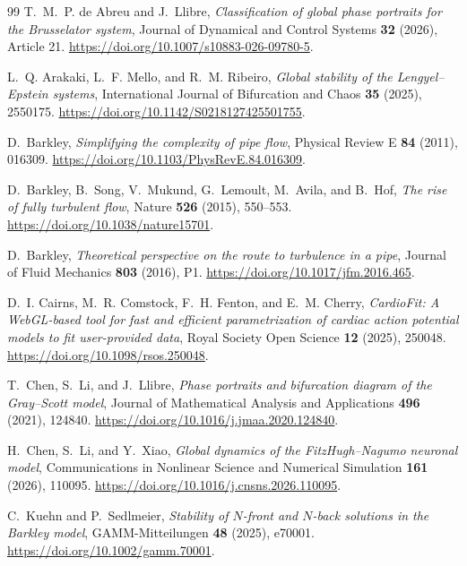 \documentclass[11pt,a4paper]{article}
\begin{document}
\begin{thebibliography}{99}
T.~M.~P. de Abreu and J.~Llibre,
\emph{Classification of global phase portraits for the Brusselator system},
Journal of Dynamical and Control Systems \textbf{32} (2026), Article 21.
\url{https://doi.org/10.1007/s10883-026-09780-5}.

L.~Q. Arakaki, L.~F. Mello, and R.~M. Ribeiro,
\emph{Global stability of the Lengyel--Epstein systems},
International Journal of Bifurcation and Chaos \textbf{35} (2025), 2550175.
\url{https://doi.org/10.1142/S0218127425501755}.

D.~Barkley,
\emph{Simplifying the complexity of pipe flow},
Physical Review E \textbf{84} (2011), 016309.
\url{https://doi.org/10.1103/PhysRevE.84.016309}.

D.~Barkley, B.~Song, V.~Mukund, G.~Lemoult, M.~Avila, and B.~Hof,
\emph{The rise of fully turbulent flow},
Nature \textbf{526} (2015), 550--553.
\url{https://doi.org/10.1038/nature15701}.

D.~Barkley,
\emph{Theoretical perspective on the route to turbulence in a pipe},
Journal of Fluid Mechanics \textbf{803} (2016), P1.
\url{https://doi.org/10.1017/jfm.2016.465}.

D.~I. Cairns, M.~R. Comstock, F.~H. Fenton, and E.~M. Cherry,
\emph{CardioFit: A WebGL-based tool for fast and efficient parametrization of cardiac action potential models to fit user-provided data},
Royal Society Open Science \textbf{12} (2025), 250048.
\url{https://doi.org/10.1098/rsos.250048}.

T.~Chen, S.~Li, and J.~Llibre,
\emph{Phase portraits and bifurcation diagram of the Gray--Scott model},
Journal of Mathematical Analysis and Applications \textbf{496} (2021), 124840.
\url{https://doi.org/10.1016/j.jmaa.2020.124840}.

H.~Chen, S.~Li, and Y.~Xiao,
\emph{Global dynamics of the FitzHugh--Nagumo neuronal model},
Communications in Nonlinear Science and Numerical Simulation \textbf{161} (2026), 110095.
\url{https://doi.org/10.1016/j.cnsns.2026.110095}.

C.~Kuehn and P.~Sedlmeier,
\emph{Stability of $N$-front and $N$-back solutions in the Barkley model},
GAMM-Mitteilungen \textbf{48} (2025), e70001.
\url{https://doi.org/10.1002/gamm.70001}.


\end{thebibliography}
\end{document}
